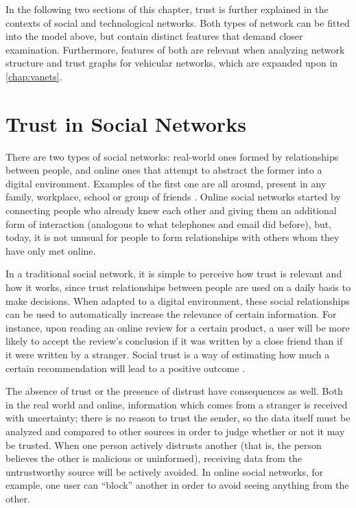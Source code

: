 In the following two sections of this chapter, trust is further explained in the contexts of social and technological networks.
Both types of network can be fitted into the model above, but contain distinct features that demand closer examination.
Furthermore, features of both are relevant when analyzing network structure and trust graphs for vehicular networks, which are expanded upon in \autoref{chap:vanets}.


\section{Trust in Social Networks}
\label{section:trustsocial}
There are two types of social networks: real-world ones formed by relationships between people, and online ones that attempt to abstract the former into a digital environment.
Examples of the first one are all around, present in any family, workplace, school or group of friends \citep{newmannetworks}.
Online social networks started by connecting people who already knew each other and giving them an additional form of interaction (analogous to what telephones and email did before), but, today, it is not unusual for people to form relationships with others whom they have only met online. 

In a traditional social network, it is simple to perceive how trust is relevant and how it works, since trust relationships between people are used on a daily basis to make decisions.
When adapted to a digital environment, these social relationships can be used to automatically increase the relevance of certain information.
For instance, upon reading an online review for a certain product, a user will be more likely to accept the review's conclusion if it was written by a close friend than if it were written by a stranger.
Social trust is a way of estimating how much a certain recommendation will lead to a positive outcome \citep{golbeck2006inferring}. 

The absence of trust or the presence of distrust have consequences as well.
Both in the real world and online, information which comes from a stranger is received with uncertainty; there is no reason to trust the sender, so the data itself must be analyzed and compared to other sources in order to judge whether or not it may be trusted.
When one person actively distrusts another (that is, the person believes the other is malicious or uninformed), receiving data from the untrustworthy source will be actively avoided.
In online social networks, for example, one user can ``block'' another in order to avoid seeing anything from the other.

